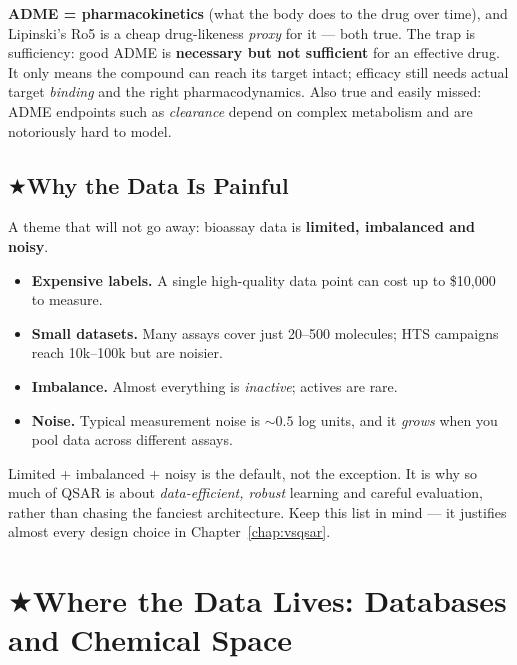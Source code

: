 \documentclass[11pt, oneside]{book}
\makeatletter
\newcommand{\starglyph}{\textcolor{stargold}{\ensuremath{\bigstar}}}
\newcommand{\starsec}[1]{%
  \texorpdfstring{\starglyph\hspace{0.4em}\textcolor{star@frame}{#1}}{#1}}
\makeatother
\begin{document}
\begin{starbox}[title={Exam-critical: what good ADME does (and doesn't) buy}]
\textbf{ADME = pharmacokinetics} (what the body does to the drug over time), and
Lipinski's Ro5 is a cheap drug-likeness \emph{proxy} for it --- both true. The trap
is sufficiency: good ADME is \textbf{necessary but not sufficient} for an effective
drug. It only means the compound can reach its target intact; efficacy still needs
actual target \emph{binding} and the right pharmacodynamics. Also true and easily
missed: ADME endpoints such as \emph{clearance} depend on complex metabolism and are
notoriously hard to model.
\end{starbox}

\subsection{\starsec{Why the Data Is Painful}}

A theme that will not go away: bioassay data is \textbf{limited, imbalanced and
noisy}.

\begin{itemize}
  \item \textbf{Expensive labels.} A single high-quality data point can cost up to
        \$10{,}000 to measure.
  \item \textbf{Small datasets.} Many assays cover just 20--500 molecules; HTS
        campaigns reach 10k--100k but are noisier.
  \item \textbf{Imbalance.} Almost everything is \emph{inactive}; actives are rare.
  \item \textbf{Noise.} Typical measurement noise is $\sim 0.5$ log units, and it
        \emph{grows} when you pool data across different assays.
\end{itemize}

\begin{notebox}[title={Set expectations accordingly}]
Limited + imbalanced + noisy is the default, not the exception. It is why so much
of QSAR is about \emph{data-efficient, robust} learning and careful evaluation,
rather than chasing the fanciest architecture. Keep this list in mind --- it
justifies almost every design choice in Chapter~\ref{chap:vsqsar}.
\end{notebox}

\section{\starsec{Where the Data Lives: Databases and Chemical Space}}
\end{document}
